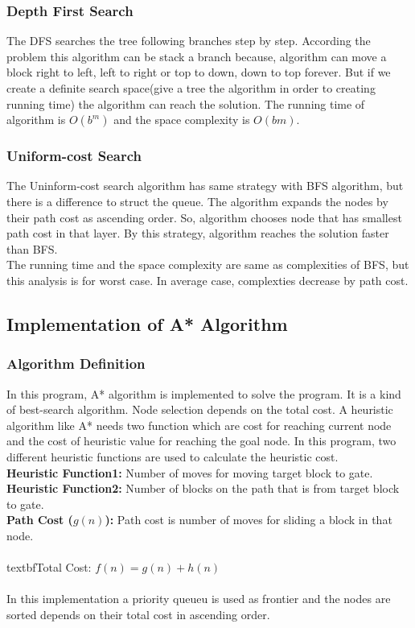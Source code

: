 \documentclass[a4paper,11pt]{report}
\begin{document}
\subsubsection*{Depth First Search}
The DFS searches the tree following branches step by step. According the problem this algorithm can be stack a branch because, 
algorithm can move a block right to left, left to right or top to down, down to top forever. But if we create a definite search space(give a tree the algorithm in order to creating running time)
the algorithm can reach the solution. The running time of algorithm is $O(b^{m})$ and the space complexity is $O(bm)$.

\subsubsection*{Uniform-cost Search}
The Uninform-cost search algorithm has same strategy with BFS algorithm, but there is a difference to struct the queue. 
The algorithm expands the nodes by their path cost as ascending order. So, algorithm chooses node that has smallest path cost in that layer. 
By this strategy, algorithm reaches the solution faster than BFS.\\ The running time and the space complexity are same as complexities of BFS, but this analysis is for worst case. 
In average case, complexties decrease by path cost.

\subsection*{Implementation of A* Algorithm}
\subsubsection*{Algorithm Definition}
In this program, A* algorithm is implemented to solve the program. It is a kind of best-search algorithm.
Node selection depends on the total cost. A heuristic algorithm like A* needs two function 
which are cost for reaching current node and the cost of heuristic value for reaching the goal node.
In this program, two different heuristic functions are used to calculate the heuristic cost.\\
\textbf{Heuristic Function1:} Number of moves for moving target block to gate.\\
\textbf{Heuristic Function2:} Number of blocks on the path that is from target block to gate.\\
\textbf{Path Cost ($g(n)$):} Path cost is number of moves for sliding a block in that node.\\
\\textbf{Total Cost: } $f(n) = g(n) + h(n)$\\
\\
In this implementation a priority queueu is used as frontier and the nodes are sorted depends on their total cost in 
ascending order.
\end{document}
